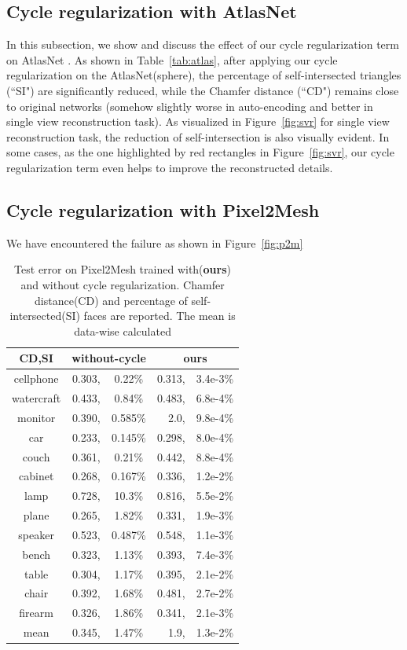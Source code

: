 \subsection{Cycle regularization with AtlasNet}
In this subsection, we show and discuss the effect of our cycle regularization term on AtlasNet \cite{atlasnet}. As shown in Table~\ref{tab:atlas}, after applying our cycle regularization on the AtlasNet(sphere), the percentage of self-intersected triangles (``SI") are significantly reduced, while the Chamfer distance (``CD") remains close to original networks (somehow slightly worse in auto-encoding and better in single view reconstruction task). As visualized in Figure~\ref{fig:svr} for single view reconstruction task, the reduction of self-intersection is also visually evident. In some cases, as the one highlighted by red rectangles in Figure~\ref{fig:svr}, our cycle regularization term even helps to improve the reconstructed details.
\subsection{Cycle regularization with Pixel2Mesh}

We have encountered the failure as shown in Figure~\ref{fig:p2m}
 

\begin{table}
	\caption{Test error on Pixel2Mesh trained with(\textbf{ours}) and without cycle regularization. Chamfer distance(CD) and percentage of self-intersected(SI) faces are reported. The mean is data-wise calculated}
	\label{tab:p2m}
	\centering
	\begin{tabular}{c|rc|rc|}
		CD,SI& \multicolumn{2}{c|}{without-cycle} & \multicolumn{2}{c|}{ours}\\
		\hline
		cellphone&0.303,&0.22\%&0.313,&3.4e-3\%\\
		watercraft&0.433,&0.84\%&0.483,&6.8e-4\%\\
		monitor&0.390,&0.585\%&2.0,&9.8e-4\%\\
		car&0.233,&0.145\%&0.298,&8.0e-4\%\\
		couch&0.361,&0.21\%&0.442,&8.8e-4\%\\
		cabinet&0.268,&0.167\%&0.336,&1.2e-2\%\\
		lamp&0.728,&10.3\%&0.816,&5.5e-2\%\\
		plane&0.265,&1.82\%&0.331,&1.9e-3\%\\
		speaker&0.523,&0.487\%&0.548,&1.1e-3\%\\
		bench&0.323,&1.13\%&0.393,&7.4e-3\%\\
		table&0.304,&1.17\%&0.395,&2.1e-2\%\\
		chair&0.392,&1.68\%&0.481,&2.7e-2\%\\
		firearm&0.326,&1.86\%&0.341,&2.1e-3\%\\
		\hline
		mean &0.345,&1.47\%&1.9,& 1.3e-2\%\\
	\end{tabular}
\end{table}

